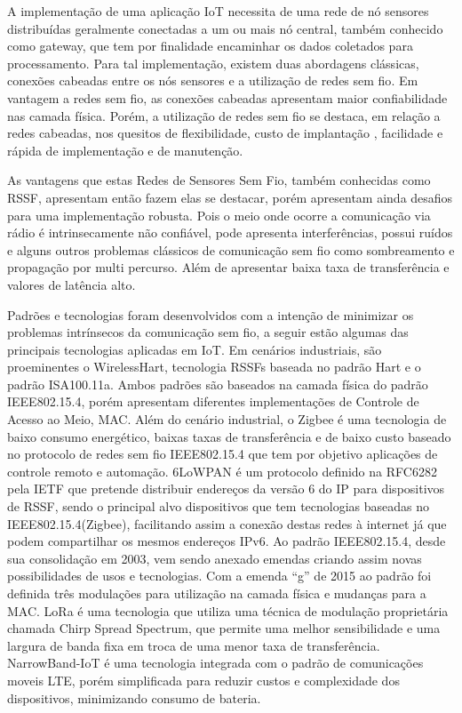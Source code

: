 A implementação de uma aplicação IoT necessita de uma rede de nó sensores distribuídas geralmente conectadas a um ou mais nó central, também conhecido como gateway, que tem por finalidade encaminhar os dados coletados para processamento. Para tal implementação, existem duas abordagens clássicas, conexões cabeadas entre os nós sensores e a utilização de redes sem fio\cite{gomes2017estimaccao}. Em vantagem a redes sem fio, as conexões cabeadas apresentam maior confiabilidade nas camada física. Porém, a utilização de redes sem fio se destaca, em relação a redes cabeadas, nos quesitos de flexibilidade, custo de implantação , facilidade e rápida de implementação e de manutenção\cite{gungor2009industrial}.

As vantagens que estas Redes de Sensores Sem Fio, também conhecidas como RSSF, apresentam então fazem elas se destacar, porém apresentam ainda desafios para uma implementação robusta. Pois o meio onde ocorre a comunicação via rádio é intrinsecamente não confiável, pode apresenta interferências, possui ruídos e alguns outros problemas clássicos de comunicação sem fio como sombreamento e propagação por multi percurso. Além de apresentar baixa taxa de transferência e valores de latência alto\cite{gomes2017estimaccao}.

Padrões e tecnologias foram desenvolvidos com a intenção de minimizar os problemas intrínsecos da comunicação sem fio, a seguir estão algumas das principais tecnologias aplicadas em IoT. Em cenários industriais, são proeminentes o WirelessHart, tecnologia RSSFs baseada no padrão Hart\cite{WIHART} e o padrão ISA100.11a. Ambos padrões são baseados na camada física do padrão IEEE802.15.4, porém apresentam diferentes implementações de Controle de Acesso ao Meio\cite{gomes2017estimaccao}, MAC. Além do cenário industrial, o Zigbee é uma tecnologia de baixo consumo energético, baixas taxas de transferência e de baixo custo baseado no protocolo de redes sem fio IEEE802.15.4 que tem por objetivo aplicações de controle remoto e automação\cite{ergen2004zigbee}. 6LoWPAN é um protocolo definido na RFC6282 pela IETF que pretende distribuir endereços da versão 6 do IP para dispositivos de RSSF, sendo o principal alvo dispositivos que tem tecnologias baseadas no IEEE802.15.4(Zigbee), facilitando assim a conexão destas redes à internet já que podem compartilhar os mesmos endereços IPv6\cite{olsson20146lowpan}. Ao padrão IEEE802.15.4, desde sua consolidação em 2003, vem sendo anexado emendas criando assim novas possibilidades de usos e tecnologias. Com a emenda ``g'' de 2015 ao padrão foi definida três modulações para utilização na camada física e mudanças para a MAC\cite{chang2012ieee}. LoRa é uma tecnologia que utiliza uma técnica de modulação proprietária chamada Chirp Spread Spectrum, que permite uma melhor sensibilidade e uma largura de banda fixa em troca de uma menor taxa de transferência\cite{sinha2017survey}. NarrowBand-IoT é uma tecnologia integrada com o padrão de comunicações moveis LTE, porém simplificada para reduzir custos e complexidade dos dispositivos, minimizando consumo de bateria\cite{sinha2017survey}.


